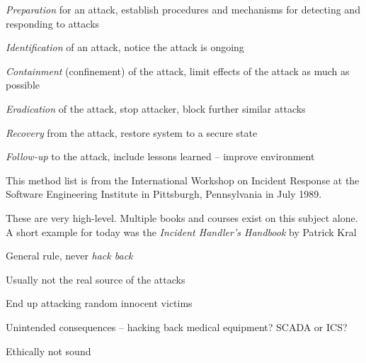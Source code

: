 \documentclass[Screen16to9,17pt]{foils}
\begin{document}

\begin{list2}
\item \emph{Preparation} for an attack, establish procedures and mechanisms for detecting and responding to attacks
\item \emph{Identification} of an attack, notice the attack is ongoing
\item \emph{Containment} (confinement) of the attack, limit effects of the attack as much as possible
\item \emph{Eradication} of the attack, stop attacker, block further similar attacks
\item \emph{Recovery} from the attack, restore system to a secure state
\item \emph{Follow-up} to the attack, include lessons learned -- improve environment
\end{list2}

This method list is from the International Workshop on Incident Response at the Software Engineering Institute in Pittsburgh, Pennsylvania in July 1989.

These are very high-level. Multiple books and courses exist on this subject alone. A short example for today was the \emph{Incident Handler's Handbook}
by Patrick Kral







\begin{list2}
\item General rule, never \emph{hack back}
\item Usually not the real source of the attacks
\item End up attacking random innocent victims
\item Unintended consequences -- hacking back medical equipment? SCADA or ICS?
\item Ethically not sound
\end{list2}





\end{document}
